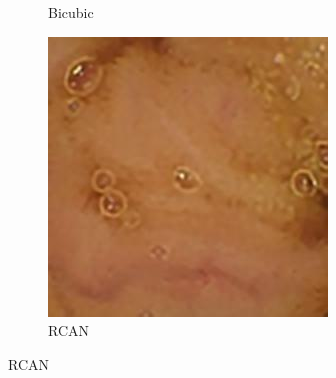 \begin{figure}[H]
\begin{subfigure}[b]{0.275\textwidth}
    \caption{Bicubic}
  \end{subfigure}
  \begin{subfigure}[b]{0.275\textwidth}
    \includegraphics[width=\textwidth]{Chapter7/rcan_9.jpg}
    \caption{RCAN}
  \end{subfigure}
  

\end{figure}
